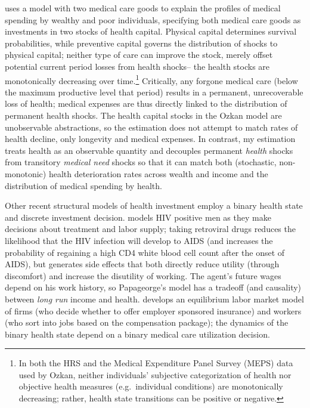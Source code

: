 \documentclass[12pt,pdftex,letterpaper]{article}
\begin{document}
\cite{ozkan14} uses a model with two medical care goods to explain the profiles of medical spending by wealthy and poor individuals, specifying both medical care goods as investments in two stocks of health capital.  Physical capital determines survival probabilities, while preventive capital governs the distribution of shocks to physical capital; neither type of care can improve the stock, merely offset potential current period losses from health shocks-- the health stocks are monotonically decreasing over time.\footnote{In both the HRS and the Medical Expenditure Panel Survey (MEPS) data used by Ozkan, neither individuals' subjective categorization of health nor objective health measures (e.g.\ individual conditions) are monotonically decreasing; rather, health state transitions can be positive or negative.}  Critically, any forgone medical care (below the maximum productive level that period) results in a permanent, unrecoverable loss of health; medical expenses are thus directly linked to the distribution of permanent health shocks.   The health capital stocks in the Ozkan model are unobservable abstractions, so the estimation does not attempt to match rates of health decline, only longevity and medical expenses.  In contrast, my estimation treats health as an observable quantity and decouples permanent \textit{health} shocks from transitory \textit{medical need} shocks so that it can match both (stochastic, non-monotonic) health deterioration rates across wealth and income and the distribution of medical spending by health.

Other recent structural models of health investment employ a binary health state and discrete investment decision.  \cite{papageorge16} models HIV positive men as they make decisions about treatment and labor supply; taking retroviral drugs reduces the likelihood that the HIV infection will develop to AIDS (and increases the probability of regaining a high CD4 white blood cell count after the onset of AIDS), but generates side effects that both directly reduce utility (through discomfort) and increase the disutility of working.  The agent's future wages depend on his work history, so Papageorge's model has a tradeoff (and causality) between \textit{long run} income and health.  \cite{aizawa17} develops an equilibrium labor market model of firms (who decide whether to offer employer sponsored insurance) and workers (who sort into jobs based on the compensation package); the dynamics of the binary health state depend on a binary medical care utilization decision.
\end{document}
